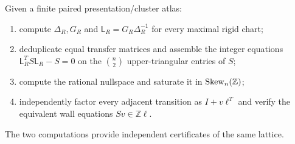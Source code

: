 \begin{algorithm}
\label{alg:globalization-lattice}
Given a finite paired presentation/cluster atlas:
\begin{enumerate}[label=\arabic*.,leftmargin=2.2em]
\item compute $\Delta_R,G_R$ and
      $\mathsf L_R=G_R\Delta_R^{-1}$ for every maximal rigid chart;
\item deduplicate equal transfer matrices and assemble the integer equations
      $\mathsf L_R^TS\mathsf L_R-S=0$ on the
      $\binom n2$ upper-triangular entries of $S$;
\item compute the rational nullspace and saturate it in
      $\operatorname{Skew}_n(\mathbb Z)$;
\item independently factor every adjacent transition as
      $I+v\ell^T$ and verify the equivalent wall equations
      $Sv\in\mathbb Z\ell$.
\end{enumerate}
The two computations provide independent certificates of the same lattice.
\end{algorithm}
